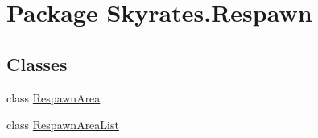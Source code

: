 \hypertarget{namespace_skyrates_1_1_respawn}{\section{Package Skyrates.\-Respawn}
\label{namespace_skyrates_1_1_respawn}
}
\subsection*{Classes}
\begin{DoxyCompactItemize}
\item 
class \hyperlink{class_skyrates_1_1_respawn_1_1_respawn_area}{Respawn\-Area}
\item 
class \hyperlink{class_skyrates_1_1_respawn_1_1_respawn_area_list}{Respawn\-Area\-List}
\end{DoxyCompactItemize}
